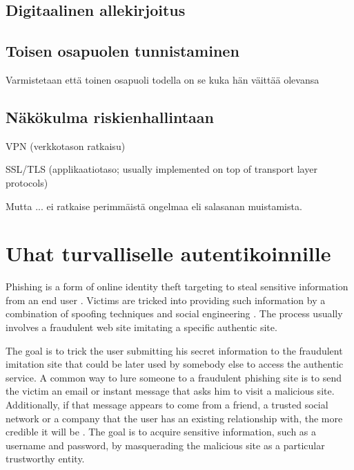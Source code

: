 \documentclass[english,gradu]{tktltiki}
\begin{document}

\subsection{Digitaalinen allekirjoitus} %
\label{sub:digitaalinen_allekirjoitus}


\subsection{Toisen osapuolen tunnistaminen} %
\label{sub:toisen_osapuolen_tunnistaminen}
Varmistetaan että toinen osapuoli todella on se kuka hän väittää olevansa


\subsection{Näkökulma riskienhallintaan} %
\label{sub:näkökulma_riskienhallintaan}
VPN (verkkotason ratkaisu)

SSL/TLS (applikaatiotaso; usually implemented on top of transport layer protocols)

Mutta ... ei ratkaise perimmäistä ongelmaa eli salasanan muistamista.



\section{Uhat turvalliselle autentikoinnille} %
\label{sec:uhat_turvalliselle_autentikoinnille}

    Phishing is a form of online identity theft targeting to steal sensitive information from an end user   \cite{phishing_attacks_and_solutions_2007, why_phishing_works_06, suspectibility_to_phishing_2006}. Victims are tricked into providing such information by a combination of spoofing techniques and social engineering \cite{visual_similarity_phishing_2008}. The process usually involves a fraudulent web site imitating a specific authentic site.

    The goal is to trick the user submitting his secret information to the fraudulent imitation site that could be later used by somebody else to access the authentic service. A common way to lure someone to a fraudulent phishing site is to send the victim an email or instant message that asks him to visit a malicious site. Additionally, if that message appears to come from a friend, a trusted social network or a company that the user has an existing relationship with, the more credible it will be \cite{suspectibility_to_phishing_2006}. The goal is to acquire sensitive information, such as a username and password, by masquerading the malicious site as a particular trustworthy entity.
\end{document}
